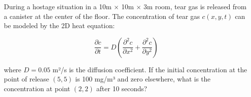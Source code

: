\documentclass[border=10pt]{standalone}
\begin{document}
\begin{tcolorbox}[
  enhanced,
  colback=white,
  colframe=questioncolor,
  boxrule=1pt,
  arc=5pt,
  outer arc=5pt,
  drop shadow={opacity=0.5},
  fontupper=\color{questioncolor}\sffamily
]
During a hostage situation in a 10m $\times$ 10m $\times$ 3m room, tear gas is released from a canister at the center of the floor. The concentration of tear gas $c(x,y,t)$ can be modeled by the 2D heat equation:

\begin{equation*}
\frac{\partial c}{\partial t} = D\left(\frac{\partial^2 c}{\partial x^2} + \frac{\partial^2 c}{\partial y^2}\right)
\end{equation*}

where $D = 0.05$ m²/s is the diffusion coefficient. If the initial concentration at the point of release $(5,5)$ is 100 mg/m³ and zero elsewhere, what is the concentration at point $(2,2)$ after 10 seconds?
\end{tcolorbox}
\end{document}

